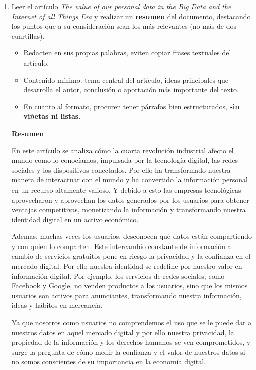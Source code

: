 \documentclass[12pt]{report}
\begin{document}
\begin{enumerate}[label=\textbf{\arabic*.}, leftmargin=*]
\begin{enumerate}[label=\textbf{\alph*.}, leftmargin=*, itemsep=1.0em]

\item Leer el art\'iculo \textit{The value of our personal data in the Big Data and the Internet of all Things Era} y realizar un \textbf{resumen} del documento, destacando los puntos que a su consideraci\'on sean los m\'as relevantes (no m\'as de dos cuartillas).
\begin{itemize}
  \item Redacten en sus propias palabras, eviten copiar frases textuales del art\'iculo.
  \item Contenido m\'inimo: tema central del art\'iculo, ideas principales que desarrolla el autor, conclusi\'on o aportaci\'on m\'as importante del texto.
  \item En cuanto al formato, procuren tener p\'arrafos bien estructurados, \textbf{sin vi\~netas ni listas}.
\end{itemize}

\textbf{Resumen}

En este artículo se analiza cómo la cuarta revolución industrial afecto el mundo como lo conocíamos, impulsada por la tecnología digital, las redes sociales y los dispositivos conectados. Por ello ha transformado nuestra manera de interactuar con el mundo y ha convertido la información personal en un recurso altamente valioso. Y debido a esto las empresas tecnológicas aprovecharon y aprovechan los datos generados por los usuarios para obtener ventajas competitivas, monetizando la información y transformando nuestra identidad digital en un activo económico.

Ademas, muchas veces los usuarios, desconocen qué datos están compartiendo y con quien lo comparten. Este intercambio constante de información a cambio de servicios gratuitos pone en riesgo la privacidad y la confianza en el mercado digital.
Por ello nuestra identidad se redefine por nuestro valor en información digital. Por ejemplo, los servicios de redes sociales, como Facebook y Google, no venden productos a los usuarios, sino que los mismos usuarios son activos para anunciantes, transformando nuestra información, ideas y hábitos en mercancía.

Ya que nosotros como usuarios no comprendemos el uso que se le puede dar a nuestros datos en aquel mercado digital y por ello nuestra privacidad, la propiedad de la información y los derechos humanos se ven comprometidos, y surge la pregunta de cómo medir la confianza y el valor de nuestros datos si no somos conscientes de su importancia en la economía digital.


\end{enumerate}
\end{enumerate}
\end{document}
